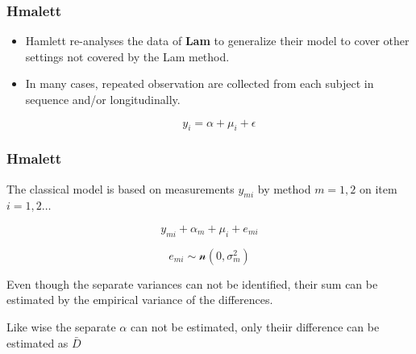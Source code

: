 \documentclass[compress]{beamer}        %
\begin{document}
\begin{frame}
\frametitle{Hmalett}
\large

\begin{itemize}
\item Hamlett re-analyses the data of \textbf{Lam} to generalize their model to cover other settings not covered by the Lam method.

\item In many cases, repeated observation are collected from each subject in sequence  and/or longitudinally.


\[ y_i = \alpha + \mu_i + \epsilon \]
\end{itemize}

\end{frame}


\begin{frame}
\frametitle{Hmalett}
The classical model is based on measurements $y_{mi}$
by method $m=1,2$ on item $i = 1,2 \ldots$

\[y_{mi} + \alpha_{m} + \mu_{i} + e_{mi}\]

\[e_{mi} \sim \mathcal{n} (0,\sigma^2_m)\]

Even though the separate variances can not be
identified, their sum can be estimated by the empirical variance of the differences.

Like wise the separate $\alpha$ can not be
estimated, only theiir difference can be estimated as
$\bar{D}$

\end{frame}
\end{document}
